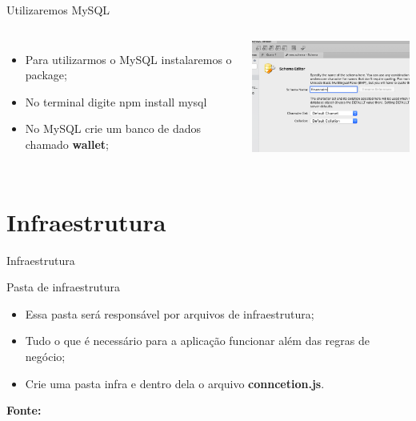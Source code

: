\documentclass{beamer}
\begin{document}
    \begin{frame}[label=lists]{Utilizaremos MySQL}
      \begin{columns}[onlytextwidth]
          \begin{itemize}
            \item Para utilizarmos o MySQL instalaremos o package;
            \item No terminal digite \alert{npm install mysql}
            \item No MySQL crie um banco de dados chamado  \textbf{wallet}; 
          \end{itemize}
            \includegraphics[width=65mm]{resources/aula6_1.png}
      \end{columns}
    \end{frame}

\section{Infraestrutura}
    \begin{frame}[label=lists]{Infraestrutura}
    \begin{exampleblock}{Pasta de infraestrutura}
        	\begin{itemize}
	\item Essa pasta será responsável por arquivos de infraestrutura;
	\item Tudo o que é necessário para a aplicação funcionar além das regras de negócio;
	\item Crie uma pasta \alert{infra} e dentro dela o arquivo \textbf{conncetion.js}.
        	\end{itemize}
      \end{exampleblock}
      \tiny{\textbf{Fonte:} \cite{nodejs2022api}}
    \end{frame}
\end{document}
